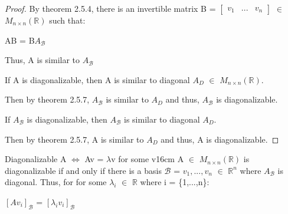     \begin{proof}
        By {\color{red} theorem 2.5.4}, there is an invertible matrix B =
        $\begin{bmatrix}
            v_1 & ... & v_n
        \end{bmatrix}$ $\in$ $M_{n \times n}(\mathbb{R})$
        such that:
        
        \hspace{0.5cm}
        AB = B$A_{\mathcal{B}}$

        Thus, A is similar to $A_{\mathcal{B}}$

        \vspace{0.3cm}

        If A is diagonalizable, then A is similar to diagonal
        $A_D$ $\in$ $M_{n \times n}(\mathbb{R})$.

        Then by {\color{red} theorem 2.5.7},
        $A_{\mathcal{B}}$ is similar to $A_D$ and thus, $A_{\mathcal{B}}$
        is diagonalizable.

        \vspace{0.3cm}

        If $A_{\mathcal{B}}$ is diagonalizable, then $A_{\mathcal{B}}$
        is similar to diagonal $A_D$.
        
        Then by {\color{red} theorem 2.5.7},
        A is similar to $A_D$ and thus, A is diagonalizable.
    \end{proof}

    \vspace{0.5cm}



    \begin{wtheorem}{Diagonalizable A $\Leftrightarrow$ Av = $\lambda$v
    for some v}{16cm}
        A $\in$ $M_{n \times n}(\mathbb{R})$ is diagonalizable if and only if
        there is a basis $\mathcal{B}$ = $v_1,...,v_n$ $\in$ $\mathbb{R}^n$ where
        $A_{\mathcal{B}}$ is diagonal.
        Thus, for for some $\lambda_i$ $\in$ $\mathbb{R}$ where i = \{1,...,n\}:

        \hspace{0.5cm}
        $[Av_i]_{\mathcal{B}}$ = $[\lambda_i v_i]_{\mathcal{B}}$
    \end{wtheorem}

